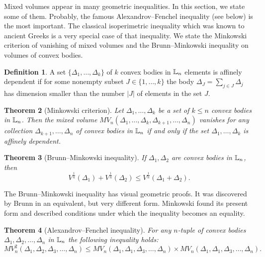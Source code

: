 \documentclass[11pt]{article}
\theoremstyle{plain}
\newtheorem{theorem}{Theorem}[section]
\theoremstyle{definition}
\newtheorem{definition}[theorem]{Definition}
\begin{document}
Mixed volumes appear in many geometric inequalities. In this section, we state some of them. Probably, the famous Alexandrov--Fenchel inequality (see below) is the most important.  The classical isoperimetric inequality which was known to ancient Greeks is a very special  case of that inequality. We  state the  Minkowski criterion  of vanishing of   mixed volumes and  the Brunn--Minkowski inequality on volumes of convex bodies.

\begin{definition} A set $\{\Delta_1,\dots,\Delta_k\}$ of $k$
convex bodies in  $\Bbb L_n$ elements is {affinely dependent} if   for some nonempty subset $J\in \{1,\dots,k\}$  the body $\Delta_J=\sum_{j\in J} \Delta_j$ has dimension smaller  than the number $|J|$ of elements in the set $J$.
\end{definition}

\begin{theorem}[Minkowski criterion]\label{Mink}
 Let $\Delta_1,\dots,\Delta_k$ be a set of $k\leq n$  convex
bodies in $\Bbb L_n$.
Then the mixed volume $MV_n(\Delta_1,\dots, \Delta_k, \Delta_{k+1},\dots, \Delta_n)$ vanishes
for any collection $\Delta_{k+1},\dots,\Delta_n$ of convex bodies in $\Bbb L_n$  if and only if the set
$\Delta_1,\dots, \Delta_k$ is affinely dependent.
\end{theorem}


\begin{theorem}[Brunn--Minkowski inequality]\label{B-M} If $\Delta_1,\Delta_2$ are convex bodies in $\Bbb L_n$, then
\begin{equation}\label{eq3}
V ^{\frac{1}{n}}(\Delta_1) + V ^{\frac{1}{n}}(\Delta_2) \leq V ^{\frac{1}{n}}(\Delta_1+\Delta_2).
\end{equation}

\end{theorem}

The Brunn--Minkowski inequality has visual  geometric proofs. It was discovered  by Brunn in an equivalent, but very different form. Minkowski found its present form  and described  conditions under which the inequality becomes an equality.


\begin{theorem}[Alexandrov--Fenchel inequality]\label{A-F}
For any $n$-tuple of convex bodies
$\Delta_1,\Delta_2,\dots,\Delta_n$ in $\Bbb L_n$ the following inequality holds:
\begin{equation}\label{eq4}
MV_n^2(\Delta_1,\Delta_2, \Delta_3,\dots,\Delta_n)\leq
MV_n(\Delta_1,\Delta_1, \Delta_3,\dots,\Delta_n)\times
MV_n(\Delta_1,\Delta_1, \Delta_3,\dots,\Delta_n).
\end{equation}

\end{theorem}
\end{document}
